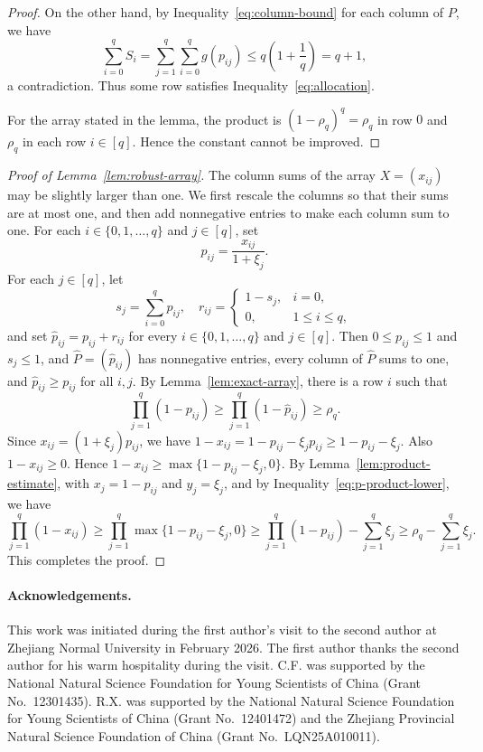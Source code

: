 \documentclass[12pt]{article}
\numberwithin{equation}{section}
\theoremstyle{definition}
\begin{document}
\begin{proof}
On the other hand, by Inequality~\eqref{eq:column-bound} for each column of $P$,
we have
\[
        \sum_{i = 0}^q S_i =
        \sum_{j = 1}^q \sum_{i = 0}^q g(p_{ij})
 \leq q\left(1 + \frac{1}{q}\right) = q + 1,
\]
a contradiction. Thus some row satisfies
Inequality~\eqref{eq:allocation}.

For the array stated in the lemma, the product is
$(1 - \rho_q)^q = \rho_q$ in row $0$ and $\rho_q$ in each row
$i \in [q]$. Hence the
constant cannot be improved.
\end{proof}

\begin{proof}[Proof of Lemma~\ref{lem:robust-array}]
The column sums of the array $X = (x_{ij})$ may be slightly larger than one.
We first rescale the columns so that their sums are at
most one, and then add nonnegative entries to make each column sum to one. For each $i \in \{0,1,\ldots,q\}$ and $j \in [q]$, set
\[
p_{ij}=\frac{x_{ij}}{1+\xi_j}.
\]
For each $j\in[q]$, let
\[
s_j=\sum_{i=0}^q p_{ij},
\quad
r_{ij}=
\begin{cases}
	1-s_j, & i=0,\\
	0, & 1\leq i\leq q,
\end{cases}
\]
and set $\widehat p_{ij}=p_{ij}+r_{ij}$ for every
$i\in\{0,1,\ldots,q\}$ and $j\in[q]$.
Then $0 \leq p_{ij} \leq 1$ and $s_j \leq 1$, and
$\widehat P = (\widehat p_{ij})$ has nonnegative entries, every column of
$\widehat P$ sums to one, and $\widehat p_{ij} \geq p_{ij}$ for all $i, j$. By
Lemma~\ref{lem:exact-array}, there is a row $i$ such that
\begin{equation}\label{eq:p-product-lower}
        \prod_{j = 1}^q(1 - p_{ij})
 \geq
        \prod_{j = 1}^q(1 - \widehat p_{ij})
 \geq \rho_q.
\end{equation}
Since
$x_{ij} = (1 + \xi_j)p_{ij}$, we have
$1 - x_{ij} = 1 - p_{ij} - \xi_j p_{ij}
\geq 1 - p_{ij} - \xi_j$. Also $1 - x_{ij} \geq 0$. Hence
$1 - x_{ij} \geq \max\{1 - p_{ij} - \xi_j,0\}$.
By Lemma~\ref{lem:product-estimate}, with $x_j = 1 - p_{ij}$ and
$y_j = \xi_j$, and by Inequality~\eqref{eq:p-product-lower}, we have
\[
        \prod_{j = 1}^q(1 - x_{ij})
 \geq
        \prod_{j = 1}^q\max\{1 - p_{ij} - \xi_j,0\}
 \geq
        \prod_{j = 1}^q(1 - p_{ij}) -
        \sum_{j = 1}^q \xi_j
 \geq
        \rho_q -
        \sum_{j = 1}^q \xi_j.
\]
This completes the proof.
\end{proof}

\paragraph{Acknowledgements.}
This work was initiated during the first author's visit to the second author at
Zhejiang Normal University in February 2026. The first author thanks the
second author for his warm hospitality during the visit. C.F. was supported by
the National Natural Science Foundation for Young Scientists of China (Grant
No.~12301435). R.X. was supported by the National Natural Science Foundation
for Young Scientists of China (Grant No.~12401472) and the Zhejiang Provincial
Natural Science Foundation of China (Grant No.~LQN25A010011).
\end{document}
